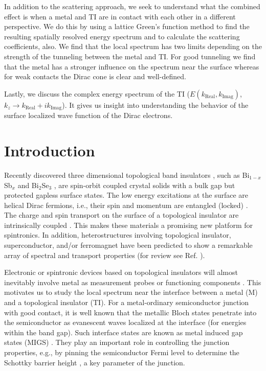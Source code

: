 In addition to the scattering approach, we seek to understand what the combined effect is when a metal and TI are in contact with each other in a different perspective. We do this by using a lattice Green's function method to find the resulting spatially resolved energy spectrum and to calculate the scattering coefficients, also. We find that the local spectrum has two limits depending on the strength of the tunneling between the metal and TI. For good tunneling we find that the metal has a stronger influence on the spectrum near the surface whereas for weak contacts the Dirac cone is clear and well-defined. 

Lastly, we discuss the complex energy spectrum of the TI ($E(k_{\text{Real}} , k_{\text{Imag}})$, $k_z \rightarrow k_{\text{Real}} + i k_{\text{Imag}}$). It gives us insight into understanding the behavior of the surface localized wave function of the Dirac electrons. 

\section{Introduction}
Recently discovered three dimensional topological band insulators \cite{fu07,moore,roy}, such as Bi$_{1-x}$Sb$_x$ \cite{Hsieh2008} and Bi$_2$Se$_3$ \cite{Xia09,zhang2009,Chen09}, are spin-orbit coupled crystal solids with a bulk gap but protected gapless surface states. The low energy excitations at the surface are helical Dirac fermions, i.e., their spin and momentum are entangled (locked) \cite{Hsieh2009}. The charge and spin transport on the surface of a topological insulator
are intrinsically coupled \cite{burkov}.
This makes these materials a promising new platform for spintronics. In addition, heterostructures involving topological insulator, superconductor, and/or ferromagnet have been predicted to show a remarkable array of spectral and transport properties (for review
see Ref. \cite{today,rmp,Qi-zhang-rev}). 

Electronic or spintronic devices based on topological insulators will almost inevitably involve metal as measurement probes or functioning components \cite{yokoyama09}. This motivates us to study the local spectrum near the interface between a metal (M) and a topological insulator (TI). For a metal-ordinary semiconductor junction with good contact, it is well known that the metallic Bloch states penetrate into the semiconductor as evanescent waves localized at the interface (for energies within the band gap). Such interface states are known as metal induced gap states (MIGS) \cite{heine65,cohen}. They play an important role in controlling the junction properties, e.g., by pinning the semiconductor Fermi level to determine the Schottky barrier height \cite{tersoff}, a key parameter of the junction.

